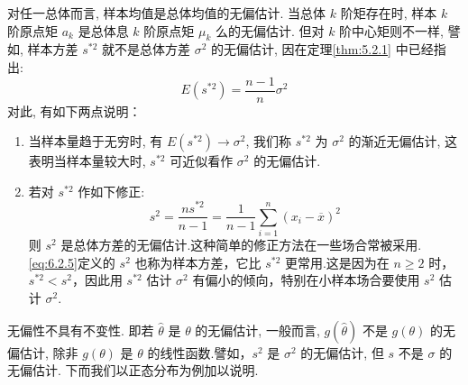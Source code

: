 \begin{example}\label{exam:6.2.4}
对任一总体而言, 样本均值是总体均值的无偏估计. 当总体 $k$ 阶矩存在时, 样本 $k$ 阶原点矩 $a_k$ 是总体息 $k$ 阶原点矩 $\mu_k$ 么的无偏估计. 但对 $k$ 阶中心矩则不一样, 譬如, 样本方差 $s^{*2}$ 就不是总体方差 $\sigma^2$ 的无偏估计, 因在定理\ref{thm:5.2.1}
中已经指出:
\[E\left(s^{* 2}\right)=\frac{n-1}{n} \sigma^{2}\]
对此, 有如下两点说明：
\begin{enumerate}
  \item 当样本量趋于无穷时, 有 $E(s^{*2})\to\sigma^2$, 我们称 $s^{*2}$ 为 $\sigma^2$ 的渐近无偏估计, 这表明当样本量较大时,  $s^{*2}$ 可近似看作 $\sigma^2$ 的无偏估计.

  \item 若对 $s^{*2}$ 作如下修正:
\begin{equation}\label{eq:6.2.5}
s^{2}=\frac{n s^{* 2}}{n-1}=\frac{1}{n-1} \sum_{i=1}^{n}\left(x_{i}-\overline{x}\right)^{2}
\end{equation}
则 $s^2$ 是总体方差的无偏估计.这种简单的修正方法在一些场合常被采用.\eqref{eq:6.2.5}定义的 $s^2$ 也称为样本方差，它比 $s^{*2}$ 更常用.这是因为在 $n\geqslant2$ 时，$s^{*2}<s^2$，因此用 $s^{*2}$ 估计 $\sigma^2$ 有偏小的倾向，特别在小样本场合要使用 $s^2$ 估计 $\sigma^2$.
\end{enumerate}

无偏性不具有不变性. 即若 $\hat{\theta}$ 是 $\theta$ 的无偏估计, 一般而言, $g(\hat{\theta})$ 不是 $g(\theta)$ 的无偏估计, 除非 $g(\theta)$ 是 $\theta$ 的线性函数.譬如，$s^2$ 是 $\sigma^2$ 的无偏估计, 但 $s$ 不是 $\sigma$ 的无偏估计. 下而我们以正态分布为例加以说明.
\end{example}

